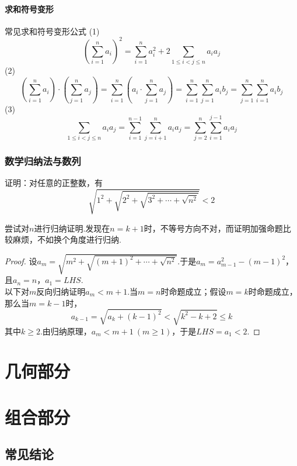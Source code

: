 \documentclass[lang=cn, zihao=4.5]{elegantbook}
\newcommand{\ssb}[1]{\left( #1 \right)}
\begin{document}
\subsection{求和符号变形}

\begin{proposition}{常见求和符号变形公式}
	(1)$$\ssb{ \sum_{i=1}^{n} a_i }^2 = \sum_{i=1}^{n} a_i^2 + 2 \sum_{1 \leq i < j \leq n} a_ia_j$$
	(2)$$\ssb{ \sum_{i=1}^{n} a_i } \cdot \ssb{ \sum_{j=1}^{n} a_j } = \sum_{i=1}^{n} \ssb{a_i \cdot \sum_{j=1}^{n} a_j} = \sum_{i=1}^{n} \sum_{j=1}^{n} a_ib_j = \sum_{j=1}^{n} \sum_{i=1}^{n} a_ib_j$$
	(3)$$\sum_{1 \leq i < j \leq n} a_ia_j = \sum_{i=1}^{n-1} \sum_{j=i+1}^{n} a_ia_j = \sum_{j=2}^{n} \sum_{i=1}^{j-1} a_ia_j$$
\end{proposition}



\section{数学归纳法与数列}

\begin{example} %
	证明：对任意的正整数，有$$\sqrt{1^2+ \sqrt{2^2+ \sqrt{3^2+ \cdots + \sqrt{n^2}}}}<2$$
\end{example}
\begin{hint}
	尝试对$n$进行归纳证明.发现在$n=k+1$时，不等号方向不对，而证明加强命题比较麻烦，不如换个角度进行归纳.
\end{hint}
\begin{proof}
	设$a_m = \sqrt{m^2+\sqrt{(m+1)^2 + \cdots + \sqrt{n^2}}}$.于是$a_m=a_{m-1}^2-(m-1)^2$，且$a_n=n$，$a_1=LHS$. \\
	以下对$m$反向归纳证明$a_m<m+1$.当$m=n$时命题成立；假设$m=k$时命题成立，那么当$m=k-1$时，$$a_{k-1} = \sqrt{a_k + (k-1)^2} < \sqrt{k^2-k+2} \leq k$$
	其中$k \geq 2$.由归纳原理，$a_m<m+1~(m \geq 1)$，于是$LHS=a_1 <2$.
\end{proof}



\part{几何部分}

\part{组合部分}

\chapter{常见结论}
\end{document}
